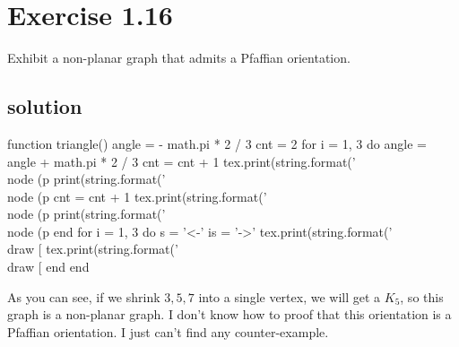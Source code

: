 \documentclass{article}
\begin{document}
\section{Exercise 1.16}
Exhibit a non-planar graph that admits a Pfaffian orientation.
\subsection{solution}

\begin{luacode*}
    function triangle() 
        angle = - math.pi * 2 / 3
        cnt = 2
        for i = 1, 3 do
            angle = angle + math.pi * 2 / 3
            cnt = cnt + 1
            tex.print(string.format('\\node (p%
            print(string.format('\\node (p%
            cnt = cnt + 1
            tex.print(string.format('\\node (p%
            print(string.format('\\node (p%
        end
        for i = 1, 3 do
            s = '<-'
            is = '->'
            tex.print(string.format('\\draw [%
            tex.print(string.format('\\draw [%
        end
    end
\end{luacode*}

\begin{center}
\end{center}
As you can see, if we shrink $3, 5, 7$ into a single vertex, we will get a $K_5$, so this graph is a non-planar graph.
\textcolor[rgb]{0.5,0,1.0}{I don't know how to proof that this orientation is a Pfaffian orientation. I just can't find any counter-example.}
\end{document}
